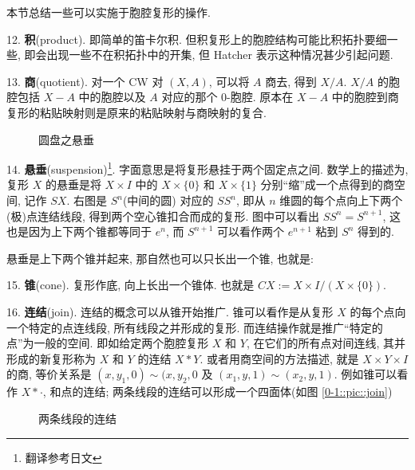 本节总结一些可以实施于胞腔复形的操作.

12. {\bf 积}(product). 即简单的笛卡尔积. 但积复形上的胞腔结构可能比积拓扑要细一些, 即会出现一些不在积拓扑中的开集, 但 Hatcher 表示这种情况甚少引起问题.

13. {\bf 商}(quotient). 对一个 CW 对 $(X, A)$, 可以将 $A$ 商去, 得到 $X / A$. $X / A$ 的胞腔包括 $X - A$ 中的胞腔以及 $A$ 对应的那个 $0$-胞腔. 原本在 $X - A$ 中的胞腔到商复形的粘贴映射则是原来的粘贴映射与商映射的复合. 

\begin{wrapfigure}{r}{2cm}

\captionsetup{font=footnotesize}
\caption{圆盘之悬垂}
\end{wrapfigure}
14. {\bf 悬垂}(suspension)\footnote{翻译参考日文}. 字面意思是将复形悬挂于两个固定点之间. 数学上的描述为, 复形 $X$ 的悬垂是将 $X \times I$ 中的 $X \times \{0\}$ 和 $X \times \{1\}$ 分别``缩''成一个点得到的商空间, 记作 $SX$. 右图是 $S^n$(中间的圆) 对应的 $S S^n$, 即从 $n$ 维圆的每个点向上下两个(极)点连结线段, 得到两个空心锥扣合而成的复形. 图中可以看出 $S S^n = S^{n + 1}$, 这也是因为上下两个锥都等同于 $e^n$, 而 $S^{n + 1}$ 可以看作两个 $e^{n + 1}$ 粘到 $S^{n}$ 得到的. 

悬垂是上下两个锥并起来, 那自然也可以只长出一个锥, 也就是:

15. {\bf 锥}(cone). 复形作底, 向上长出一个锥体. 也就是 $CX := X \times I / (X \times \{0\})$.

16. {\bf 连结}(join). 连结的概念可以从锥开始推广. 锥可以看作是从复形 $X$ 的每个点向一个特定的点连线段, 所有线段之并形成的复形. 而连结操作就是推广``特定的点''为一般的空间. 即如给定两个胞腔复形 $X$ 和 $Y$, 在它们的所有点对间连线, 其并形成的新复形称为 $X$ 和 $Y$ 的连结 $X \ast Y$. 或者用商空间的方法描述, 就是 $X \times Y \times I$ 的商, 等价关系是 $(x, y_1, 0) \sim (x, y_2, 0$ 及 $(x_1, y, 1) \sim (x_2, y, 1)$. 例如锥可以看作 $X \ast \cdot$, 和点的连结; 两条线段的连结可以形成一个四面体(如图 \ref{0-1::pic::join})

\begin{figure}[h]

\caption{两条线段的连结}
\end{figure}